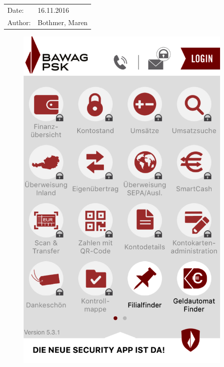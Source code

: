 \begin{tabular}{l l}
Date: & 16.11.2016 \\
Author: & Bothmer, Maren \\
\end{tabular}

\begin{figure}[H] 
    \begin{minipage}[b]{.5\linewidth}
        \centering\includegraphics[width=0.94\textwidth]{img/screenshots/ex1p1.png}
    \end{minipage}%
    \begin{minipage}[b]{.5\linewidth}

\end{minipage}
\end{figure}
